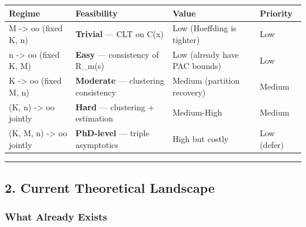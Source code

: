 \documentclass[
  12pt,
]{article}
\begin{document}
\begin{longtable}[]{@{}
  >{\raggedright\arraybackslash}p{}
  >{\raggedright\arraybackslash}p{}
  >{\raggedright\arraybackslash}p{}
  >{\raggedright\arraybackslash}p{}@{}}
\toprule\noalign{}
\begin{minipage}[b]{\linewidth}\raggedright
Regime
\end{minipage} & \begin{minipage}[b]{\linewidth}\raggedright
Feasibility
\end{minipage} & \begin{minipage}[b]{\linewidth}\raggedright
Value
\end{minipage} & \begin{minipage}[b]{\linewidth}\raggedright
Priority
\end{minipage} \\
\midrule\noalign{}
\endhead
\bottomrule\noalign{}
\endlastfoot
M -\textgreater{} oo (fixed K, n) & \textbf{Trivial} --- CLT on C(x) &
Low (Hoeffding is tighter) & Low \\
n -\textgreater{} oo (fixed K, M) & \textbf{Easy} --- consistency of
R\_m(s) & Low (already have PAC bounds) & Low \\
K -\textgreater{} oo (fixed M, n) & \textbf{Moderate} --- clustering
consistency & Medium (partition recovery) & Medium \\
(K, n) -\textgreater{} oo jointly & \textbf{Hard} --- clustering +
estimation & Medium-High & Medium \\
(K, M, n) -\textgreater{} oo jointly & \textbf{PhD-level} --- triple
asymptotics & High but costly & Low (defer) \\
\end{longtable}

\begin{center}\rule{0.5\linewidth}{0.5pt}\end{center}

\subsection{2. Current Theoretical
Landscape}\label{current-theoretical-landscape}

\subsubsection{What Already Exists}\label{what-already-exists}
\end{document}
